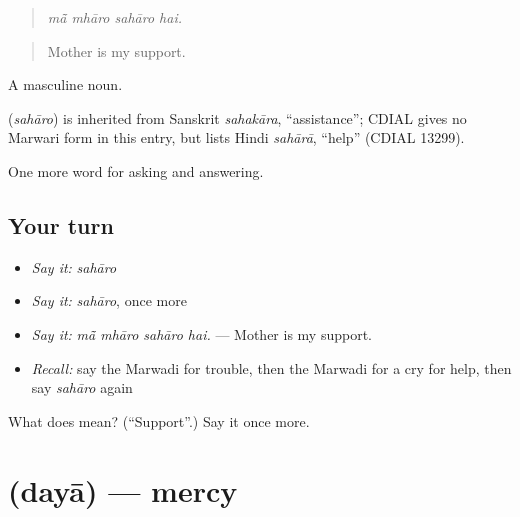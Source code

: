 \begin{quote}
   
\end{quote}

\begin{quote}
\emph{mā̃ mhāro sahāro hai.}
\end{quote}

\begin{quote}
Mother is my support.
\end{quote}

A masculine noun.

\begin{cousinweb}
\textbf{} (\emph{sahāro}) is inherited from Sanskrit \emph{sahakāra}, \textquotedblleft{}assistance\textquotedblright{}; CDIAL gives no Marwari form in this entry, but lists Hindi \emph{sahārā}, \textquotedblleft{}help\textquotedblright{} (CDIAL 13299).
\end{cousinweb}

\begin{grammarlens}[title={What you've built}]
One more word for asking and answering.
\end{grammarlens}

\subsection*{Your turn}
\begin{itemize}
\raggedright
  \item \emph{Say it:} \emph{sahāro}
  \item \emph{Say it:} \emph{sahāro}, once more
  \item \emph{Say it:} \emph{mā̃ mhāro sahāro hai.} — Mother is my support.
  \item \emph{Recall:} say the Marwadi for trouble, then the Marwadi for a cry for help, then say \emph{sahāro} again
\end{itemize}

\begin{tcolorbox}[breakable,colback=teal!4,colframe=teal!35!black,title={Before you move on}]
What does  mean? (\textquotedblleft{}Support\textquotedblright{}.) Say it once more.
\end{tcolorbox}
\section[\texorpdfstring{\mw{दया} (dayā)}{दया (dayā)}]{ (dayā) — mercy}

\label{lesson:MW-C274-daya}



